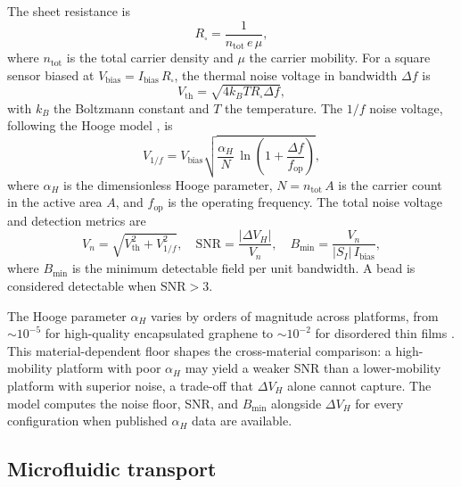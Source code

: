 \documentclass[pdflatex,sn-basic]{sn-jnl}
\theoremstyle{thmstyleone}
\theoremstyle{thmstyletwo}
\theoremstyle{thmstylethree}
\begin{document}
The sheet resistance is
\begin{equation}
R_\square = \frac{1}{n_\text{tot}\, e\, \mu},
\label{eq:rsq}
\end{equation}
where $n_\text{tot}$ is the total carrier density and $\mu$ the carrier mobility. For a square sensor biased at $V_\text{bias} = I_\text{bias}\, R_\square$, the thermal noise voltage in bandwidth $\Delta f$ is
\begin{equation}
V_\text{th} = \sqrt{4 k_B T R_\square \Delta f},
\label{eq:thermal}
\end{equation}
with $k_B$ the Boltzmann constant and $T$ the temperature. The $1/f$ noise voltage, following the Hooge model \citep{xu2013,huang2014}, is
\begin{equation}
V_{1/f} = V_\text{bias}\sqrt{\frac{\alpha_H}{N}\,\ln\!\left(1 + \frac{\Delta f}{f_\text{op}}\right)},
\label{eq:flicker}
\end{equation}
where $\alpha_H$ is the dimensionless Hooge parameter, $N = n_\text{tot}\, A$ is the carrier count in the active area $A$, and $f_\text{op}$ is the operating frequency. The total noise voltage and detection metrics are
\begin{equation}
V_n = \sqrt{V_\text{th}^2 + V_{1/f}^2}, \quad \text{SNR} = \frac{|\Delta V_H|}{V_n}, \quad B_\text{min} = \frac{V_n}{|S_I|\, I_\text{bias}},
\label{eq:snr}
\end{equation}
where $B_\text{min}$ is the minimum detectable field per unit bandwidth. A bead is considered detectable when $\text{SNR} > 3$.

The Hooge parameter $\alpha_H$ varies by orders of magnitude across platforms, from ${\sim}10^{-5}$ for high-quality encapsulated graphene to ${\sim}10^{-2}$ for disordered thin films \citep{xu2013,huang2014}. This material-dependent floor shapes the cross-material comparison: a high-mobility platform with poor $\alpha_H$ may yield a weaker SNR than a lower-mobility platform with superior noise, a trade-off that $\Delta V_H$ alone cannot capture. The model computes the noise floor, SNR, and $B_\text{min}$ alongside $\Delta V_H$ for every configuration when published $\alpha_H$ data are available.

\subsection{Microfluidic transport}\label{sec:transport}
\end{document}

